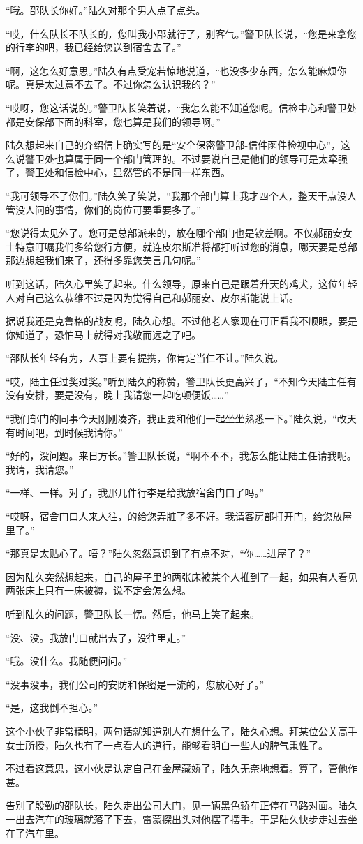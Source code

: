 “哦。邵队长你好。”陆久对那个男人点了点头。

“哎，什么队长不队长的，您叫我小邵就行了，别客气。”警卫队长说，“您是来拿您的行李的吧，我已经给您送到宿舍去了。”

“啊，这怎么好意思。”陆久有点受宠若惊地说道，“也没多少东西，怎么能麻烦你呢。真是太过意不去了。不过你怎么认识我的？”

“哎呀，您这话说的。”警卫队长笑着说，“我怎么能不知道您呢。信检中心和警卫处都是安保部下面的科室，您也算是我们的领导啊。”

陆久想起来自己的介绍信上确实写的是“安全保密警卫部-信件函件检视中心”，这么说警卫处也算属于同一个部门管理的。不过要说自己是他们的领导可是太牵强了，警卫处和信检中心，显然管的不是同一样东西。

“我可领导不了你们。”陆久笑了笑说，“我那个部门算上我才四个人，整天干点没人管没人问的事情，你们的岗位可要重要多了。”

“您说得太见外了。您可是总部派来的，放在哪个部门也是钦差啊。不仅郝丽安女士特意叮嘱我们多给您行方便，就连皮尔斯准将都打听过您的消息，哪天要是总部那边想起我们来了，还得多靠您美言几句呢。”

听到这话，陆久心里笑了起来。什么领导，原来自己是跟着升天的鸡犬，这位年轻人对自己这么恭维不过是因为觉得自己和郝丽安、皮尔斯能说上话。

据说我还是克鲁格的战友呢，陆久心想。不过他老人家现在可正看我不顺眼，要是你知道了，恐怕马上就得对我敬而远之了吧。

“邵队长年轻有为，人事上要有提携，你肯定当仁不让。”陆久说。

“哎，陆主任过奖过奖。”听到陆久的称赞，警卫队长更高兴了，“不知今天陆主任有没有安排，要是没有，晚上我请您一起吃顿便饭……”

“我们部门的同事今天刚刚凑齐，我正要和他们一起坐坐熟悉一下。”陆久说，“改天有时间吧，到时候我请你。”

“好的，没问题。来日方长。”警卫队长说，“啊不不不，我怎么能让陆主任请我呢。我请，我请您。”

“一样、一样。对了，我那几件行李是给我放宿舍门口了吗。”

“哎呀，宿舍门口人来人往，的给您弄脏了多不好。我请客房部打开门，给您放屋里了。”

“那真是太贴心了。唔？”陆久忽然意识到了有点不对，“你……进屋了？”

因为陆久突然想起来，自己的屋子里的两张床被某个人推到了一起，如果有人看见两张床上只有一床被褥，说不定会怎么想。

听到陆久的问题，警卫队长一愣。然后，他马上笑了起来。

“没、没。我放门口就出去了，没往里走。”

“哦。没什么。我随便问问。”

“没事没事，我们公司的安防和保密是一流的，您放心好了。”

“是，这我倒不担心。”

这个小伙子非常精明，两句话就知道别人在想什么了，陆久心想。拜某位公关高手女士所授，陆久也有了一点看人的道行，能够看明白一些人的脾气秉性了。

不过看这意思，这小伙是认定自己在金屋藏娇了，陆久无奈地想着。算了，管他作甚。

告别了殷勤的邵队长，陆久走出公司大门，见一辆黑色轿车正停在马路对面。陆久一出去汽车的玻璃就落了下去，雷蒙探出头对他摆了摆手。于是陆久快步走过去坐在了汽车里。



